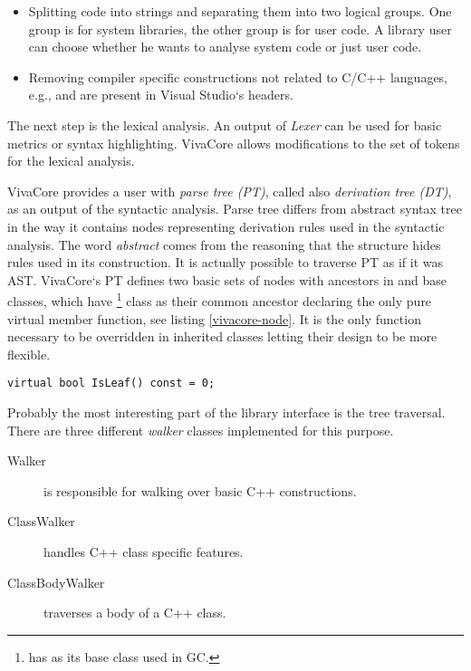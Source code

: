 \begin{itemize}
\item Splitting code into strings and separating them into two logical groups. One group is for system libraries, the other group is for user code. A library user can choose whether he wants to analyse system code or just user code.
\item Removing compiler specific constructions not related to C/C++ languages, e.g.,  and  are present in Visual Studio`s headers.
\end{itemize}

The next step is the lexical analysis. An output of \emph{Lexer} can be used for basic metrics or syntax highlighting. VivaCore allows modifications to the set of tokens for the lexical analysis.

VivaCore provides a user with \emph{parse tree (PT)}, called also \emph{derivation tree (DT)}, as an output of the syntactic analysis. Parse tree differs from abstract syntax tree in the way it contains nodes representing derivation rules used in the syntactic analysis. The word \emph{abstract} comes from the reasoning that the structure hides rules used in its construction. It is actually possible to traverse PT as if it was AST. VivaCore`s PT defines two basic sets of nodes with ancestors in  and  base classes, which have \footnote{ has  as its base class used in GC.} class as their common ancestor declaring the only pure virtual member function, see listing \ref{vivacore-node}. It is the only function necessary to be overridden in inherited classes letting their design to be more flexible.

\begin{lstlisting}[caption={The pure virtual member function of the base class for the VivaCore parse tree node.}, label={vivacore-node}]
virtual bool IsLeaf() const = 0;
\end{lstlisting}

Probably the most interesting part of the library interface is the tree traversal. There are three different \emph{walker} classes implemented for this purpose.

\begin{description}
\item[Walker] is responsible for walking over basic C++ constructions.
\item[ClassWalker] handles C++ class specific features.
\item[ClassBodyWalker] traverses a body of a C++ class.
\end{description}

